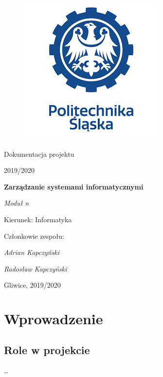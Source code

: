\documentclass[12pt,a4paper]{article}
\begin{document}
\clearpage
\begin{figure}[h]
\centering
\includegraphics{media/ps-logo.png}
\end{figure}
\hspace{3cm}
\begin{center}Dokumentacja projektu\end{center}
\begin{center}2019/2020\end{center}
\hspace{3cm}
\begin{center}\large\textbf{Zarządzanie systemami informatycznymi}\end{center}
\begin{center}\large\textit{Moduł n}\end{center}

\hspace{7cm}
\begin{flushright}Kierunek: Informatyka
\end{flushright}
\begin{flushright}Członkowie zespołu:
\par
\textit{Adrian Kapczyński}
\par
\textit{Radosław Kapczyński}
\end{flushright}
\vfill
\begin{center}Gliwice, 2019/2020\end{center}

\newpage
{}
\tableofcontents

\newpage
\section{Wprowadzenie}

\subsection{Role w projekcie}
\ldots 
\end{document}

